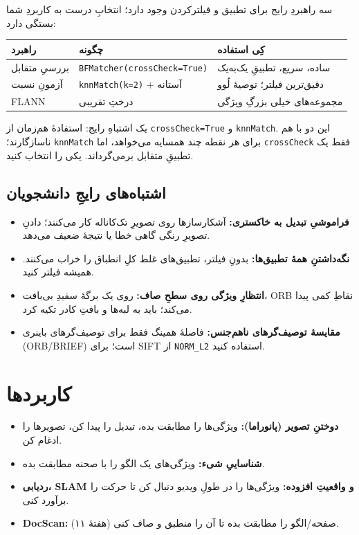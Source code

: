 \documentclass[12pt]{article}
\begin{document}
سه راهبردِ رایج برای تطبیق و فیلترکردن وجود دارد؛ انتخابِ درست به کاربردِ شما بستگی دارد:

\begin{center}
\begin{tabular}{@{}lll@{}}
\hline
\textbf{راهبرد} & \textbf{چگونه} & \textbf{کِی استفاده} \\
\hline
بررسیِ متقابل & \texttt{BFMatcher(crossCheck=True)} & ساده، سریع، تطبیقِ یک‌به‌یک \\
آزمونِ نسبت & \texttt{knnMatch(k=2)} + آستانه & دقیق‌ترین فیلتر؛ توصیهٔ لُوو \\
FLANN & درختِ تقریبی & مجموعه‌های خیلی بزرگِ ویژگی \\
\hline
\end{tabular}
\end{center}

\begin{hoshdar}
یک اشتباهِ رایج: استفادهٔ هم‌زمان از \texttt{crossCheck=True} و \texttt{knnMatch}. این دو با هم ناسازگارند؛ \texttt{knnMatch} برای هر نقطه چند همسایه می‌خواهد، اما \texttt{crossCheck} فقط یک تطبیقِ متقابل برمی‌گرداند. یکی را انتخاب کنید.
\end{hoshdar}

\subsection{اشتباه‌های رایجِ دانشجویان}

\begin{itemize}
  \item \textbf{فراموشیِ تبدیل به خاکستری:} آشکارسازها روی تصویرِ تک‌کاناله کار می‌کنند؛ دادنِ تصویرِ رنگی گاهی خطا یا نتیجهٔ ضعیف می‌دهد.
  \item \textbf{نگه‌داشتنِ همهٔ تطبیق‌ها:} بدونِ فیلتر، تطبیق‌های غلط کلِ انطباق را خراب می‌کنند. همیشه فیلتر کنید.
  \item \textbf{انتظارِ ویژگی روی سطحِ صاف:} روی یک برگهٔ سفیدِ بی‌بافت، ORB نقاطِ کمی پیدا می‌کند؛ باید به لبه‌ها و بافتِ کادر تکیه کرد.
  \item \textbf{مقایسهٔ توصیف‌گرهای ناهم‌جنس:} فاصلهٔ همینگ فقط برای توصیف‌گرهای باینری (ORB/BRIEF) است؛ برای SIFT از \texttt{NORM\_L2} استفاده کنید.
\end{itemize}

\section{کاربردها}

\begin{itemize}
  \item \textbf{دوختنِ تصویر (پانوراما):} ویژگی‌ها را مطابقت بده، تبدیل را پیدا کن، تصویرها را ادغام کن.
  \item \textbf{شناساییِ شیء:} ویژگی‌های یک الگو را با صحنه مطابقت بده.
  \item \textbf{ردیابی، SLAM و واقعیتِ افزوده:} ویژگی‌ها را در طولِ ویدیو دنبال کن تا حرکت را برآورد کنی.
  \item \textbf{DocScan:} صفحه/الگو را مطابقت بده تا آن را منطبق و صاف کنی (هفتهٔ ۱۱).
\end{itemize}
\end{document}
